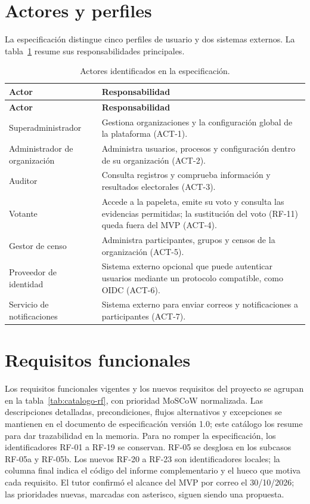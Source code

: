 \section{Actores y perfiles}
\label{sec:actores}

La especificación distingue cinco perfiles de usuario y dos sistemas externos.
La tabla~\ref{tab:actores} resume sus responsabilidades principales.

\begin{longtable}{|p{}|p{}|}
\caption{Actores identificados en la especificación.}\label{tab:actores}\\
\hline
\textbf{Actor} & \textbf{Responsabilidad} \\
\hline
\endfirsthead
\hline
\textbf{Actor} & \textbf{Responsabilidad} \\
\hline
\endhead
Superadministrador & Gestiona organizaciones y la configuración global de la plataforma (ACT-1). \\
\hline
Administrador de organización & Administra usuarios, procesos y configuración dentro de su organización (ACT-2). \\
\hline
Auditor & Consulta registros y comprueba información y resultados electorales (ACT-3). \\
\hline
Votante & Accede a la papeleta, emite su voto y consulta las evidencias permitidas; la sustitución del voto (RF-11) queda fuera del MVP (ACT-4). \\
\hline
Gestor de censo & Administra participantes, grupos y censos de la organización (ACT-5). \\
\hline
Proveedor de identidad & Sistema externo opcional que puede autenticar usuarios mediante un protocolo compatible, como OIDC (ACT-6). \\
\hline
Servicio de notificaciones & Sistema externo para enviar correos y notificaciones a participantes (ACT-7). \\
\hline
\end{longtable}

\section{Requisitos funcionales}
\label{sec:requisitos-funcionales}

Los requisitos funcionales vigentes y los nuevos requisitos del proyecto se agrupan en la
tabla~\ref{tab:catalogo-rf}, con prioridad MoSCoW normalizada. Las descripciones detalladas, precondiciones,
flujos alternativos y excepciones se mantienen en el documento de
especificación versión 1.0; este catálogo los resume para dar trazabilidad en
la memoria. Para no romper la especificación, los identificadores RF-01 a
RF-19 se conservan. RF-05 se desglosa en los subcasos RF-05a y RF-05b. Los nuevos RF-20 a RF-23 son identificadores locales; la
columna final indica el código del informe complementario y el hueco que
motiva cada requisito. El tutor confirmó el alcance del MVP por correo el
30/10/2026; las prioridades nuevas, marcadas con asterisco, siguen siendo una
propuesta.

